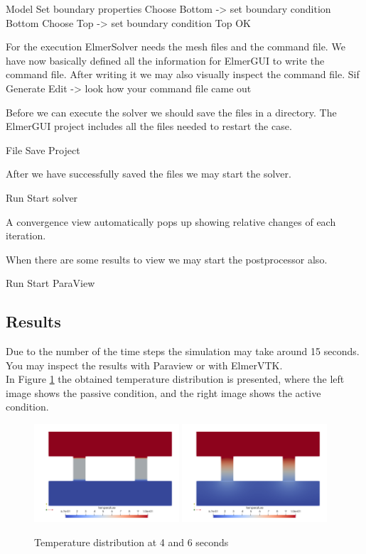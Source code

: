 \ttbegin
Model
  Set boundary properties
    Choose Bottom -> set boundary condition Bottom
    Choose Top -> set boundary condition Top
   OK 
\ttend

For the execution ElmerSolver needs the mesh files and the command file.  We have now basically defined all the information for ElmerGUI to write the command file. After writing it we may also visually inspect the command file.
\ttbegin
Sif 
  Generate
  Edit -> look how your command file came out  
\ttend

Before we can execute the solver we should save the files in a directory.  The ElmerGUI project includes all the files needed to restart the case.

\ttbegin
File 
  Save Project
\ttend

After we have successfully saved the files we may start the solver.

\ttbegin
Run
  Start solver
\ttend

A convergence view automatically pops up showing relative changes of each iteration.

When there are some results to view we may start the postprocessor also.

\ttbegin
Run
  Start ParaView
\ttend

\subsection*{Results}

Due to the number of the time steps the simulation may take around 15 seconds.\\

You may inspect the results with Paraview or with ElmerVTK.\\

In Figure \ref{fg:temp} the obtained temperature distribution is presented, where the left image shows the passive condition, and the right image shows the active condition. 

\begin{figure}[h]
\centering
\includegraphics[width=0.48\textwidth]{temp-4}
\includegraphics[width=0.48\textwidth]{temp-6}
\caption{Temperature distribution at 4 and 6 seconds}\label{fg:temp}
\end{figure} 

\hfill
